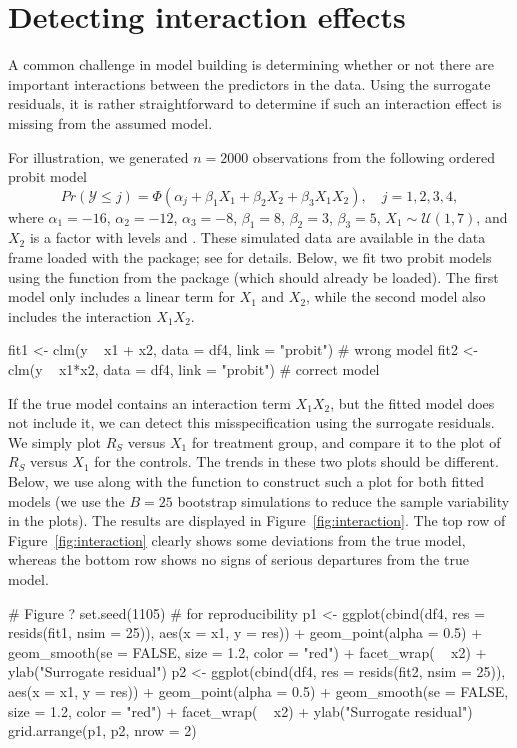 \section{Detecting interaction effects}

A common challenge in model building is determining whether or not there are important interactions between the predictors in the data. Using the surrogate residuals, it is rather straightforward to determine if such an interaction effect is missing from the assumed model.

For illustration, we generated $n = 2000$ observations from the following ordered probit model
\begin{equation*}
  Pr\left(\mathcal{Y} \le j\right) = \Phi\left(\alpha_j + \beta_1 X_1 + \beta_2 X_2 + \beta_3 X_1 X_2\right), \quad j = 1, 2, 3, 4,
\end{equation*}
where $\alpha_1 = -16$, $\alpha_2 = -12$, $\alpha_3 = -8$, $\beta_1 = 8$, $\beta_2 = 3$, $\beta_3 = 5$, $X_1 \sim \mathcal{U}\left(1, 7\right)$, and $X_2$ is a factor with levels  and . These simulated data are available in the  data frame loaded with the  package; see  for details. Below, we fit two probit models using the  function from the  package (which should already be loaded). The first model only includes a linear term for $X_1$ and $X_2$, while the second model also includes the interaction $X_1 X_2$.
\begin{example}
fit1 <- clm(y ~ x1 + x2, data = df4, link = "probit")  # wrong model
fit2 <- clm(y ~ x1*x2, data = df4, link = "probit")  # correct model
\end{example}

If the true model contains an interaction term $X_1 X_2$, but the fitted model does not include it, we can detect this misspecification using the surrogate residuals. We simply plot $R_S$ versus $X_1$ for treatment group, and compare it to the plot of $R_S$ versus $X_1$ for the controls. The trends in these two plots should be different. Below, we use  along with the  function to construct such a plot for both fitted models (we use the $B = 25$ bootstrap simulations to reduce the sample variability in the plots). The results are displayed in Figure~\ref{fig:interaction}. The top row of Figure~\ref{fig:interaction} clearly shows some deviations from the true model, whereas the bottom row shows no signs of serious departures from the true model.
\begin{example}
# Figure ?
set.seed(1105)  # for reproducibility
p1 <- ggplot(cbind(df4, res = resids(fit1, nsim = 25)), aes(x = x1, y = res)) +
  geom_point(alpha = 0.5) +
  geom_smooth(se = FALSE, size = 1.2, color = "red") +
  facet_wrap( ~ x2) +
  ylab("Surrogate residual")
p2 <- ggplot(cbind(df4, res = resids(fit2, nsim = 25)), aes(x = x1, y = res)) +
  geom_point(alpha = 0.5) +
  geom_smooth(se = FALSE, size = 1.2, color = "red") +
  facet_wrap( ~ x2) +
  ylab("Surrogate residual")
grid.arrange(p1, p2, nrow = 2)
\end{example}

